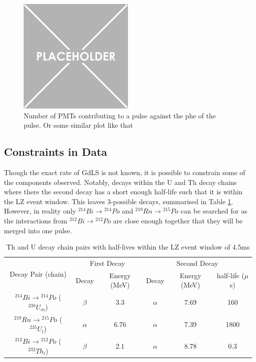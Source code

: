\begin{figure}
    \centering
    \includegraphics[width=0.5\textwidth]{Figures/Placeholder.png}
    \caption{Number of PMTs contributing to a pulse against the phe of the pulse. Or some similar plot like that}
    \label{fig:OD_coincidence_difference}
\end{figure}


\subsection{Constraints in Data}
\par
Though the exact rate of GdLS is not known, it is possible to constrain some of the components observed.
Notably, decays within the U and Th decay chains where there the second decay has a short enough half-life such that it is within the LZ event window.
This leaves 3-possible decays, summarised in Table \ref{tab:od_constrainable_decays_in_data}.
However, in reality only  ${}^{214}Bi \to {}^{214}Po$ and ${}^{219}Rn \to {}^{215}Po$ can be searched for as the interactions from ${}^{212}Bi \to {}^{212}Po$ are close enough together that they will be merged into one pulse.

\begin{table}[!htbp]
    \centering
    \begin{tabular}{c|c|c|c|c|c}
        \multirow{2}{*}{Decay Pair (chain)}                    & \multicolumn{2}{c|}{First Decay}   & \multicolumn{3}{c}{Second Decay}    \\ 
                                                               & Decay    & Energy (MeV) & Decay    & Energy (MeV) & half-life ($\mu$s) \\ \hline
        ${}^{214}Bi \to {}^{214}Po$ (${}^{238}U_{m}$)          & $\beta$  & 3.3          & $\alpha$ & 7.69         & 160   \\ 
        ${}^{219}Rn \to {}^{215}Po$ (${}^{235}U_{l}$)          & $\alpha$ & 6.76         & $\alpha$ & 7.39         & 1800  \\ 
        ${}^{212}Bi \to {}^{212}Po$ (${}^{232}Th_{l}$)         & $\beta$  & 2.1          & $\alpha$ & 8.78         & 0.3
    \end{tabular}
    \caption{Th and U decay chain pairs with half-lives within the LZ event window of 4.5ms}
    \label{tab:od_constrainable_decays_in_data}
\end{table}

